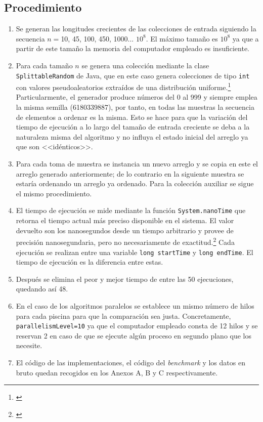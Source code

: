 \documentclass[titlepage]{article}
\begin{document}
\subsection{Procedimiento}%

\begin{enumerate}
	\item Se generan las longitudes crecientes de las colecciones de entrada siguiendo la secuencia $n=$10, 45, 100, 450, 1000... $10^8$. El máximo tamaño es $10^8$ ya que a partir de este tamaño la memoria del computador empleado es insuficiente.
	\item Para cada tamaño $n$ se genera una colección mediante la clase \lstinline|SplittableRandom| de Java, que en este caso genera colecciones de tipo \lstinline|int| con valores pseudoaleatorios extraídos de una distribución uniforme.\footnote{\cite{OracleSplittableRandom}} Particularmente, el generador produce números del 0 al 999 y siempre emplea la misma semilla (6180339887), por tanto, en todas las muestras la secuencia de elementos a ordenar es la misma. Esto se hace para que la variación del tiempo de ejecución a lo largo del tamaño de entrada creciente se deba a la naturaleza misma del algoritmo y no influya el estado inicial del arreglo ya que son <<idénticos>>.
	\item Para cada toma de muestra se instancia un nuevo arreglo y se copia en este el arreglo generado anteriormente; de lo contrario en la siguiente muestra se estaría ordenando un arreglo ya ordenado. Para la colección auxiliar se sigue el mismo procedimiento.
	\item El tiempo de ejecución se mide mediante la función \lstinline|System.nanoTime| que retorna el tiempo actual más preciso disponible en el sistema. El valor devuelto son los nanosegundos desde un tiempo arbitrario y provee de precisión nanosegundaria, pero no necesariamente de exactitud.\footnote{\cite{OracleSystem}} Cada ejecución se realizan entre una variable \lstinline|long startTime| y \lstinline|long endTime|. El tiempo de ejecución es la diferencia entre estas.
	\item Después se elimina el peor y mejor tiempo de entre las 50 ejecuciones, quedando así 48.
	\item En el caso de los algoritmos paralelos se establece un mismo número de hilos para cada piscina para que la comparación sea justa. Concretamente, \lstinline|parallelismLevel=10| ya que el computador empleado consta de 12 hilos y se reservan 2 en caso de que se ejecute algún proceso en segundo plano que los necesite. 
	\item El código de las implementaciones, el código del \textit{benchmark} y los datos en bruto quedan recogidos en los Anexos A, B y C respectivamente.
	
\end{enumerate}
\end{document}
